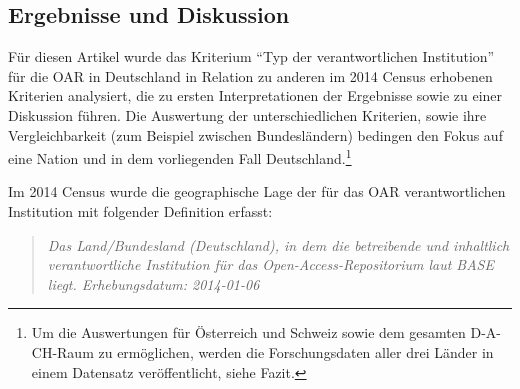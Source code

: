 \documentclass[a4paper,
fontsize=11pt,
oneside,
numbers=noperiodatend,
parskip=half-,
bibliography=totoc,
final
]{scrartcl}
\begin{document}
\subsection*{Ergebnisse und
Diskussion}\label{ergebnisse-und-diskussion}

Für diesen Artikel wurde das Kriterium \enquote{Typ der verantwortlichen
Institution} für die OAR in Deutschland in Relation zu anderen im 2014
Census erhobenen Kriterien analysiert, die zu ersten Interpretationen
der Ergebnisse sowie zu einer Diskussion führen. Die Auswertung der
unterschiedlichen Kriterien, sowie ihre Vergleichbarkeit (zum Beispiel zwischen
Bundesländern) bedingen den Fokus auf eine Nation und in dem
vorliegenden Fall Deutschland.\footnote{Um die Auswertungen für
  Österreich und Schweiz sowie dem gesamten D-A-CH-Raum zu ermöglichen,
  werden die Forschungsdaten aller drei Länder in einem Datensatz
  veröffentlicht, siehe Fazit.}


Im 2014 Census wurde die geographische Lage der für das OAR
verantwortlichen Institution mit folgender Definition erfasst:

\begin{quote}
\emph{Das Land/Bundesland (Deutschland), in dem die betreibende und
inhaltlich verantwortliche Institution für das Open-Access-Repositorium
laut BASE liegt. Erhebungsdatum: 2014-01-06}
\end{quote}
\end{document}
